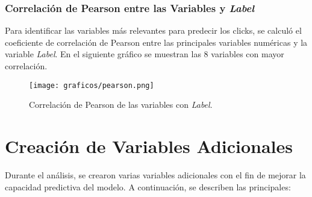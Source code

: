 \documentclass[a4paper,12pt]{article}
\begin{document}
\subsubsection{Correlación de Pearson entre las Variables y \textit{Label}}

Para identificar las variables más relevantes para predecir los clicks, se calculó el coeficiente de correlación de Pearson entre las principales variables numéricas y la variable \textit{Label}. En el siguiente gráfico se muestran las 8 variables con mayor correlación.

\begin{figure}[H]
    \centering
    \texttt{[image: graficos/pearson.png]}
    \caption{Correlación de Pearson de las variables con \textit{Label}.}
\end{figure}

\section{Creación de Variables Adicionales}

Durante el análisis, se crearon varias variables adicionales con el fin de mejorar la capacidad predictiva del modelo. A continuación, se describen las principales:
\end{document}
